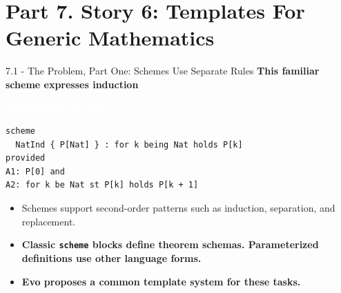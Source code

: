 \documentclass[aspectratio=169,11pt]{beamer}
\newcommand{\statusbadge}[2]{\colorbox{#1}{\textcolor{white}{\strut\scriptsize\sffamily\bfseries #2}}}
\newcommand{\badgeMML}{\statusbadge{blue!45!black}{exact MML excerpt}}
\begin{document}
\section{Part 7. Story 6: Templates For Generic Mathematics}
\begin{frame}[fragile,t]{7.1 - The Problem, Part One: Schemes Use Separate Rules}
\smallskip
\textbf{\textcolor{blue!55!black}{\textbf{This familiar scheme expresses induction}}}~\badgeMML
\begin{lstlisting}[language={mizar},basicstyle=\ttfamily\small]
scheme
  NatInd { P[Nat] } : for k being Nat holds P[k]
provided
A1: P[0] and
A2: for k be Nat st P[k] holds P[k + 1]
\end{lstlisting}
\begin{itemize}
\setlength{\itemsep}{1pt}
\setlength{\parsep}{0pt}
\setlength{\parskip}{0pt}
\item Schemes support second-order patterns such as induction, separation, and replacement.
\item \textcolor{blue!55!black}{\textbf{Classic \texttt{scheme} blocks define theorem schemas. Parameterized definitions use other language forms.}}
\item \textcolor{blue!55!black}{\textbf{Evo proposes a common template system for these tasks.}}
\end{itemize}
\end{frame}
\end{document}

